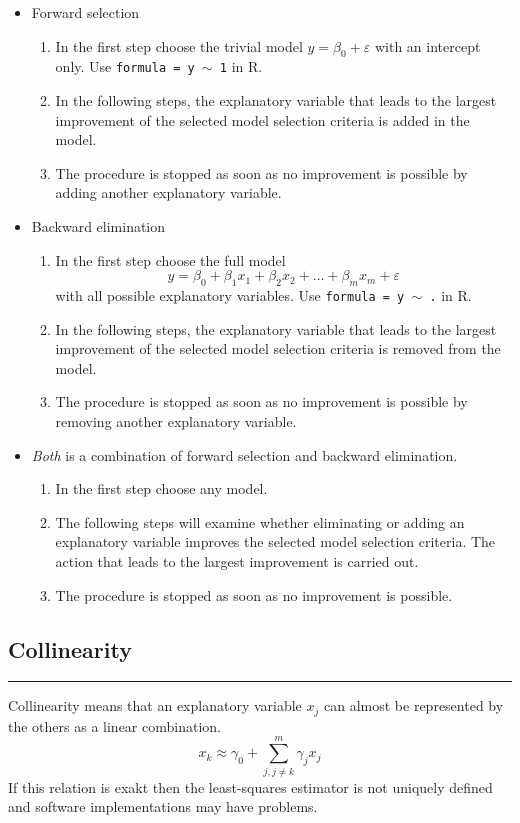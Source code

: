 \begin{itemize}
  \item Forward selection
  \begin{enumerate}
    \item In the first step choose the trivial model $y = \beta_0 + \varepsilon$ with an intercept only. Use \texttt{formula = y $\sim$ 1} in R.
    \item In the following steps, the explanatory variable that leads to the largest improvement of the selected model selection criteria is added in the model.
    \item The procedure is stopped as soon as no improvement is possible by adding another explanatory variable.
  \end{enumerate}

  \item Backward elimination
  \begin{enumerate}
    \item In the first step choose the full model
    \begin{equation}
      y = \beta_0 + \beta_1 x_1 + \beta_2 x_2 + \dots + \beta_m x_m + \varepsilon
    \end{equation}
    with all possible explanatory variables. Use \texttt{formula = y $\sim$ .} in R.
    \item In the following steps, the explanatory variable that leads to the largest improvement of the selected model selection criteria is removed from the model.
    \item The procedure is stopped as soon as no improvement is possible by removing another explanatory variable.
  \end{enumerate}

  \item \emph{Both} is a combination of forward selection and backward elimination.
  \begin{enumerate}
    \item In the first step choose any model.
    \item The following steps will examine whether eliminating or adding an explanatory variable improves the selected model selection criteria. The action that leads to  the largest improvement is carried out.
    \item The procedure is stopped as soon as no improvement is possible.
  \end{enumerate}
\end{itemize}


\subsection{Collinearity}
\noindent\rule[\linienAbstand]{\linewidth}{\linienDicke}
Collinearity means that an explanatory variable $x_j$ can almost be represented by the others as a linear combination.
\begin{equation}
  x_k \approx \gamma_0 + \sum^m_{j, j\neq k}\gamma_j x_j
\end{equation}
If this relation is exakt then the least-squares estimator is not uniquely defined and software implementations may have problems.\\

